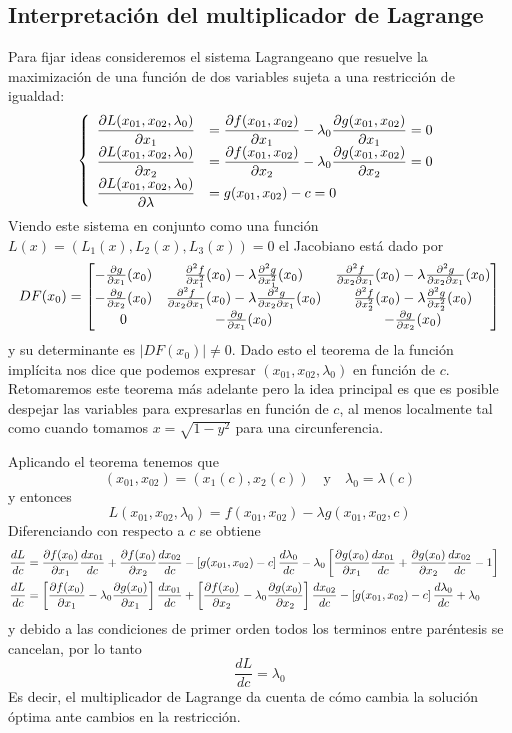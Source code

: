 \subsection{Interpretaci\'on del multiplicador de Lagrange}

Para fijar ideas consideremos el sistema Lagrangeano que resuelve la maximizaci\'on de una funci\'on de dos variables sujeta a una restricci\'on de igualdad:
$$\left\{
\begin{array}{ll}
\displaystyle \frac{\partial L(x_{01},x_{02},\lambda_0)}{\partial x_1} 	&= \displaystyle \frac{\partial f(x_{01},x_{02})}{\partial x_1}-\lambda_0 \displaystyle \frac{\partial g(x_{01},x_{02})}{\partial x_1}=0 \\
\displaystyle \frac{\partial L(x_{01},x_{02},\lambda_0)}{\partial x_2} 	&= \displaystyle \frac{\partial f(x_{01},x_{02})}{\partial x_2}-\lambda_0 \displaystyle \frac{\partial g(x_{01},x_{02})}{\partial x_2}=0 \\
\displaystyle \frac{\partial L(x_{01},x_{02},\lambda_0)}{\partial \lambda} &= g(x_{01},x_{02})-c=0 \\
\end{array}
\right.$$
Viendo este sistema en conjunto como una funci\'on $L(x)=(L_1(x),L_2(x),L_3(x))=0$ el Jacobiano est\'a dado por
$$DF(x_0)=
\begin{bmatrix}
-\frac{\partial g}{\partial x_1}(x_0) & \frac{\partial ^2f}{\partial x_1^2}(x_0)-\lambda \frac{\partial ^2g}{\partial x_1^2}(x_0) & \frac{\partial ^2f}{\partial x_2 \partial x_1}(x_0)-\lambda \frac{\partial ^2g}{\partial x_2 \partial x_1}(x_0) \cr
-\frac{\partial g}{\partial x_2}(x_0) & \frac{\partial ^2f}{\partial x_2 \partial x_1}(x_0)-\lambda \frac{\partial ^2g}{\partial x_2 \partial x_1}(x_0) & \frac{\partial ^2f}{\partial x_2^2}(x_0)-\lambda \frac{\partial ^2g}{\partial x_2^2}(x_0) \cr
0 & -\frac{\partial g}{\partial x_1}(x_0) & -\frac{\partial g}{\partial x_2}(x_0) \cr
\end{bmatrix}
$$
y su determinante es $|DF(x_0)|\neq 0$. Dado esto el teorema de la funci\'on impl\'icita nos dice que podemos expresar $(x_{01},x_{02},\lambda_0)$ en funci\'on de $c$. Retomaremos este teorema m\'as adelante pero la idea principal es que es posible despejar las variables para expresarlas en funci\'on de $c$, al menos localmente tal como cuando tomamos $x=\sqrt{1-y^2}$ para una circunferencia. 

Aplicando el teorema tenemos que 
$$(x_{01},x_{02})=(x_1(c),x_2(c)) \quad \text{y} \quad \lambda_0 = \lambda(c) $$
y entonces
$$L(x_{01},x_{02},\lambda_0)=f(x_{01},x_{02})-\lambda g(x_{01},x_{02},c)$$
Diferenciando con respecto a $c$ se obtiene
\begin{align*}
\frac{dL}{dc} &=
\frac{\partial f(x_0)}{\partial x_1}\frac{dx_{01}}{dc}+\frac{\partial f(x_0)}{\partial x_2}\frac{dx_{02}}{dc}
-\left[g(x_{01},x_{02})-c \right]\frac{d\lambda_0}{dc}
-\lambda_0 \left[\frac{\partial g(x_0)}{\partial x_1}\frac{dx_{01}}{dc} 
+ \frac{\partial g(x_0)}{\partial x_2}\frac{dx_{02}}{dc} - 1\right] \cr
\frac{dL}{dc} &=
\left[\frac{\partial f(x_0)}{\partial x_1} - \lambda_0 \frac{\partial g(x_0)}{\partial x_1}\right]\frac{dx_{01}}{dc}
+\left[\frac{\partial f(x_0)}{\partial x_2}-\lambda_0 \frac{\partial g(x_0)}{\partial x_2}\right]\frac{dx_{02}}{dc}
-\left[g(x_{01},x_{02})-c \right]\frac{d\lambda_0}{dc}+\lambda_0
\end{align*}
y debido a las condiciones de primer orden todos los terminos entre par\'entesis se cancelan, por lo tanto
$$\frac{dL}{dc}=\lambda_0$$
Es decir, el multiplicador de Lagrange da cuenta de c\'omo cambia la soluci\'on \'optima ante cambios en la restricci\'on.


